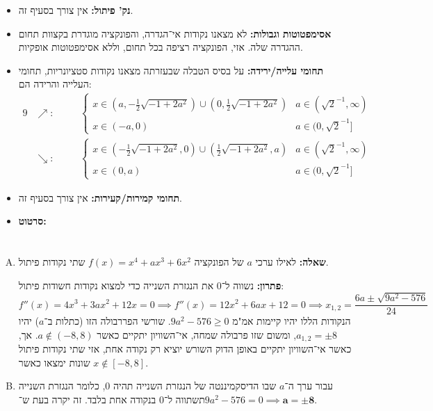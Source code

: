 \documentclass[]{article}
\renewcommand\inf {\infty}
\newcommand\xot       {x_{1, 2}}
\newcommand\cl [1]    {\left ( #1 \right )}
\begin{document}
\begin{enumerate}
\begin{itemize}
			\item \textbf{נק' פיתול: }אין צורך בסעיף זה. 
			\item \textbf{אסימפטוטות וגבולות: }לא מצאנו נקודות אי־הגדרה, והפונקציה מוגדרת בקצוות תחום ההגדרה שלה. אזי, הפונקציה רציפה בכל תחום, וללא אסימפטוטות אופקיות. 
			\item \textbf{תחומי עלייה/ירידה: }על בסיס הטבלה שבעזרתה מצאנו נקודות סטציונריות, תחומי העלייה והרידה הם: 
			\begin{alignat*}{9}
				&\nearrow \colon && \quad \begin{cases}
					x \in \cl{a, -\frac{1}{2}\sqrt{-1 + 2a^2}} \cup \cl{0, \frac{1}{2}\sqrt{-1 + 2a^2}} & a \in (\sqrt{2}^{-1}, \inf) \\
					x \in \cl{-a, 0} & a \in (0, \sqrt{2}^{-1}]
				\end{cases} \\
				&\searrow \colon && \quad \begin{cases}
					x \in \cl{-\frac{1}{2}\sqrt{-1 + 2a^2}, 0} \cup \cl{\frac{1}{2}\sqrt{-1 + 2a^2}, a} & a \in (\sqrt{2}^{-1}, \inf) \\
					x \in \cl{0, a} & a \in (0, \sqrt{2}^{-1}]
				\end{cases}
			\end{alignat*}
			\item \textbf{תחומי קמירות/קעירות: }אין צורך בסעיף זה. 
			\item \textbf{סרטוט: }
		\end{itemize}
	\end{enumerate}
	
	\section{}
	\begin{enumerate}[A)]
		\item \textbf{שאלה: }לאילו ערכי $a$ של הפונקציה $f(x) = x^4 + ax^3 + 6x^2$ שתי נקודות פיתול. 
		
		\textbf{פתרון: }נשווה ל־0 את הנגזרת השנייה כדי למצוא נקודות חשודות פיתול: 
		\[ f''(x) = 4x^3 + 3ax^2 + 12x = 0 \implies f''(x) = 12x^2 + 6ax + 12 = 0 \implies \xot = \frac{6a \pm \sqrt{9a^2 - 576}}{24} \]
		הנקודות הללו יהיו קיימות אמ"מ $9a^2 - 576 \ge 0$. שורשי הפררבולה הזו (כתלות ב־$a$) יהיו $a_{1, 2} = \pm 8$, ומשום שזו פרבולה שמחה, אי־השוויון יתקיים כאשר ${a \not\in (-8, 8)}$. אך, כאשר אי־השוויון יתקיים באופן הדוק השורש יוציא רק נקודה אחת, אזי שתי נקודות פיתול שונות ימצאו כאשר $x \not\in [-8, 8]$. 
		\item עבור ערך ה־$a$ שבו הדיסקמיננטה של הנגזרת השנייה תהיה $0$, כלומר הנגזרת השנייה תשתווה ל־$0$ בנקודה אחת בלבד. זה יקרה בעת ש־$9a^2 - 576 = 0 \implies \bm{a = \pm 8}$. 
	\end{enumerate}
	
\end{document}
